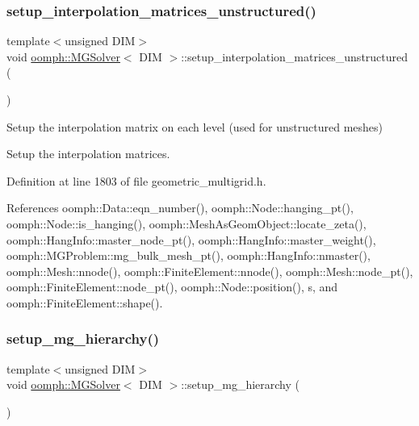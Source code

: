 \subsubsection{\texorpdfstring{setup\+\_\+interpolation\+\_\+matrices\+\_\+unstructured()}{setup\_interpolation\_matrices\_unstructured()}}
{\footnotesize\ttfamily template$<$unsigned D\+IM$>$ \\
void \hyperlink{classoomph_1_1MGSolver}{oomph\+::\+M\+G\+Solver}$<$ D\+IM $>$\+::setup\+\_\+interpolation\+\_\+matrices\+\_\+unstructured (\begin{DoxyParamCaption}{ }\end{DoxyParamCaption})}



Setup the interpolation matrix on each level (used for unstructured meshes) 

Setup the interpolation matrices. 

Definition at line 1803 of file geometric\+\_\+multigrid.\+h.



References oomph\+::\+Data\+::eqn\+\_\+number(), oomph\+::\+Node\+::hanging\+\_\+pt(), oomph\+::\+Node\+::is\+\_\+hanging(), oomph\+::\+Mesh\+As\+Geom\+Object\+::locate\+\_\+zeta(), oomph\+::\+Hang\+Info\+::master\+\_\+node\+\_\+pt(), oomph\+::\+Hang\+Info\+::master\+\_\+weight(), oomph\+::\+M\+G\+Problem\+::mg\+\_\+bulk\+\_\+mesh\+\_\+pt(), oomph\+::\+Hang\+Info\+::nmaster(), oomph\+::\+Mesh\+::nnode(), oomph\+::\+Finite\+Element\+::nnode(), oomph\+::\+Mesh\+::node\+\_\+pt(), oomph\+::\+Finite\+Element\+::node\+\_\+pt(), oomph\+::\+Node\+::position(), s, and oomph\+::\+Finite\+Element\+::shape().

\mbox{\label{classoomph_1_1MGSolver_a8b25ea9a7781f95ddf46b4b8d427d3d0}} 
\subsubsection{\texorpdfstring{setup\+\_\+mg\+\_\+hierarchy()}{setup\_mg\_hierarchy()}}
{\footnotesize\ttfamily template$<$unsigned D\+IM$>$ \\
void \hyperlink{classoomph_1_1MGSolver}{oomph\+::\+M\+G\+Solver}$<$ D\+IM $>$\+::setup\+\_\+mg\+\_\+hierarchy (\begin{DoxyParamCaption}{ }\end{DoxyParamCaption})\hspace{0.3cm}{\ttfamily [private]}}



